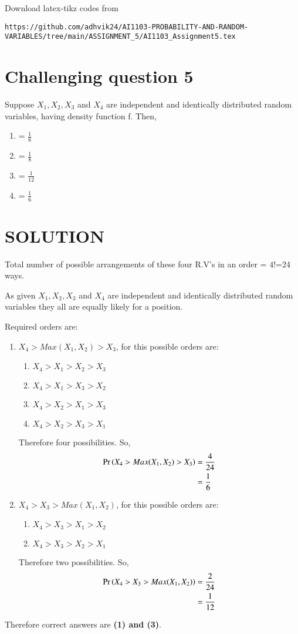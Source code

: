 \documentclass[journal,12pt,twocolumn]{IEEEtran}
\begin{document}
%
Download latex-tikz codes from 
%
\begin{lstlisting}
https://github.com/adhvik24/AI1103-PROBABILITY-AND-RANDOM-VARIABLES/tree/main/ASSIGNMENT_5/AI1103_Assignment5.tex
\end{lstlisting}
\section{Challenging question 5}
Suppose $X_1,X_2,X_3$ and $X_4$ are independent and identically distributed random variables, having density function f. Then,
\begin{enumerate}
\item {} = $\frac{1}{6}$
\item {} = $\frac{1}{8}$
\item {} = $\frac{1}{12}$
\item {} = $\frac{1}{6}$
\end{enumerate}
\section{SOLUTION}
Total number of possible arrangements of these four R.V's in an order = $4!$=24 ways.

As given $X_1,X_2,X_3$ and $X_4$ are independent and identically distributed random variables they all are equally likely for a position.

Required orders are:
\begin{enumerate}
    \item $X_4 > Max(X_1,X_2) > X_3$, for this possible orders are: 
\begin{enumerate}
    \item $X_4 > X_1 > X_2 > X_3$
    \item $X_4 > X_1 > X_3 > X_2$
    \item $X_4 > X_2 > X_1 > X_3$
    \item $X_4 > X_2 > X_3 > X_1$
\end{enumerate}
    Therefore four possibilities. So,
    \begin{align}
        \Pr\left(X_4 > Max(X_1,X_2) > X_3\right)&=\frac{4}{24}\\
        &=\frac{1}{6}
    \end{align}
    \item $X_4 > X_3 > Max(X_1,X_2)$, for this possible orders are: 
\begin{enumerate}
    \item $X_4 > X_3 > X_1 > X_2$
    \item $X_4 > X_3 > X_2 > X_1$
\end{enumerate}
Therefore two possibilities. So,
\begin{align}
    \Pr\left(X_4 > X_3 > Max(X_1,X_2)\right)&=\frac{2}{24}\\
    &=\frac{1}{12}
\end{align}
\end{enumerate}
Therefore correct answers are \textbf{(1) and (3)}.
\end{document}
